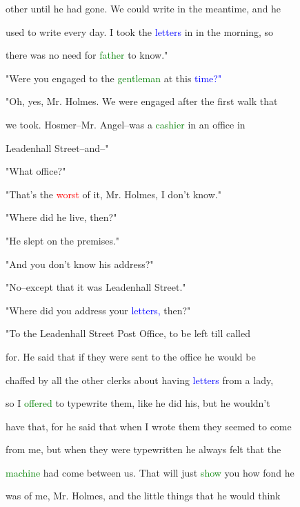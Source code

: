  other until he had gone. We could write in the meantime, and he

 used to write every day. I took the \textcolor{blue}{letters} in in the morning, so

 there was no need for \textcolor{green}{father} to know."



 "Were you engaged to the \textcolor{green}{gentleman} at this \textcolor{blue}{time?"}



 "Oh, yes, Mr. Holmes. We were engaged after the first walk that

 we took. Hosmer--Mr. Angel--was a \textcolor{green}{cashier} in an office in

 Leadenhall Street--and--"



 "What office?"



 "That's the \textcolor{red}{worst} of it, Mr. Holmes, I don't know."



 "Where did he live, then?"



 "He slept on the premises."



 "And you don't know his address?"



 "No--except that it was Leadenhall Street."



 "Where did you address your \textcolor{blue}{letters,} then?"



 "To the Leadenhall Street Post Office, to be left till called

 for. He said that if they were sent to the office he would be

 chaffed by all the other clerks about having \textcolor{blue}{letters} from a lady,

 so I \textcolor{green}{offered} to typewrite them, like he did his, but he wouldn't

 have that, for he said that when I wrote them they seemed to come

 from me, but when they were typewritten he always felt that the

 \textcolor{green}{machine} had come between us. That will just \textcolor{green}{show} you how fond he

 was of me, Mr. Holmes, and the little things that he would think

